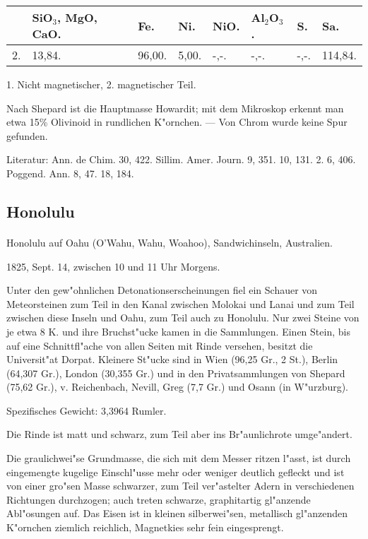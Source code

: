 \documentclass[a4paper, 11pt, oneside]{article}
\begin{document}
\begin{table}[!ht]
    \centering
    \begin{tabular}{l l l l l l l l}
         & SiO$_{3}$, MgO, CaO. & Fe. & Ni. & NiO. & Al$_{2}$O$_{3}$. & S. & Sa. \\ \hline
        2. & 13,84. & 96,00. & 5,00. & -,-. & -,-. & -,-. & 114,84. \\
    \end{tabular}
\end{table}

1. Nicht magnetischer, 2. magnetischer Teil.

Nach Shepard ist die Hauptmasse Howardit; mit dem Mikroskop erkennt man etwa 15\% Olivinoid in rundlichen K"ornchen. --- Von Chrom wurde keine Spur gefunden.

\footnotesize
Literatur: Ann. de Chim. 30, 422. Sillim. Amer. Journ. 9, 351. 10, 131. 2. 6, 406. Poggend. Ann. 8, 47. 18, 184.

\subsection{Honolulu}
\normalsize
\paragraph{}
Honolulu auf Oahu (O'Wahu, Wahu, Woahoo), Sandwichinseln, Australien.

1825, Sept. 14, zwischen 10 und 11 Uhr Morgens.

Unter den gew"ohnlichen Detonationserscheinungen fiel ein Schauer von Meteorsteinen zum Teil in den Kanal zwischen Molokai und Lanai und zum Teil zwischen diese Inseln und Oahu, zum Teil auch zu Honolulu. Nur zwei Steine von je etwa 8 K. und ihre Bruchst"ucke kamen in die Sammlungen. Einen Stein, bis auf eine Schnittfl"ache von allen Seiten mit Rinde versehen, besitzt die Universit"at Dorpat. Kleinere St"ucke sind in Wien (96,25 Gr., 2 St.), Berlin (64,307 Gr.), London (30,355 Gr.) und in den Privatsammlungen von Shepard (75,62 Gr.), v. Reichenbach, Nevill, Greg (7,7 Gr.) und Osann (in W"urzburg).

Spezifisches Gewicht: 3,3964 Rumler.

Die Rinde ist matt und schwarz, zum Teil aber ins Br"aunlichrote umge"andert.

Die graulichwei"se Grundmasse, die sich mit dem Messer ritzen l"asst, ist durch eingemengte kugelige Einschl"usse mehr oder weniger deutlich gefleckt und ist von einer gro"sen Masse schwarzer, zum Teil ver"astelter Adern in verschiedenen Richtungen durchzogen; auch treten schwarze, graphitartig gl"anzende Abl"osungen auf. Das Eisen ist in kleinen silberwei"sen, metallisch gl"anzenden K"ornchen ziemlich reichlich, Magnetkies sehr fein eingesprengt.
\end{document}
